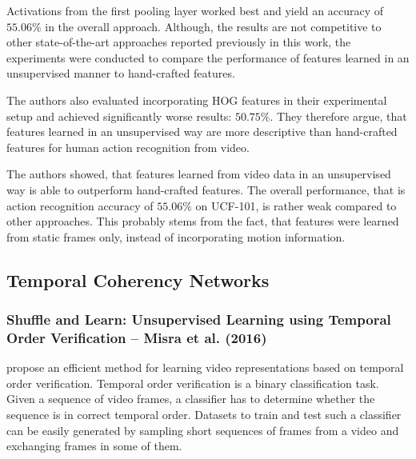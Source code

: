 Activations from the first pooling layer worked best and yield an accuracy of $55.06\%$ in the overall approach.
Although, the results are not competitive to other state-of-the-art approaches reported previously in this work, the experiments were conducted to compare the performance of features learned in an unsupervised manner to hand-crafted features.

The authors also evaluated incorporating HOG features in their experimental setup and achieved significantly worse results: $50.75\%$.
They therefore argue, that features learned in an unsupervised way are more descriptive than hand-crafted features for human action recognition from video.

The authors showed, that features learned from video data in an unsupervised way is able to outperform hand-crafted features.
The overall performance, that is action recognition accuracy of $55.06\%$ on UCF-101, is rather weak compared to other approaches.
This probably stems from the fact, that features were learned from static frames only, instead of incorporating motion information.

\subsection{Temporal Coherency Networks}

\subsubsection[Shuffle and Learn: Unsupervised Learning using Temporal Order Verification (2016)]{Shuffle and Learn: Unsupervised Learning using Temporal Order Verification -- Misra et al. (2016)}
\textcite{misra_shuffle_2016} propose an efficient method for learning video representations based on temporal order verification.
Temporal order verification is a binary classification task.
Given a sequence of video frames, a classifier has to determine whether the sequence is in correct temporal order.
Datasets to train and test such a classifier can be easily generated by sampling short sequences of frames from a video and exchanging frames in some of them.

